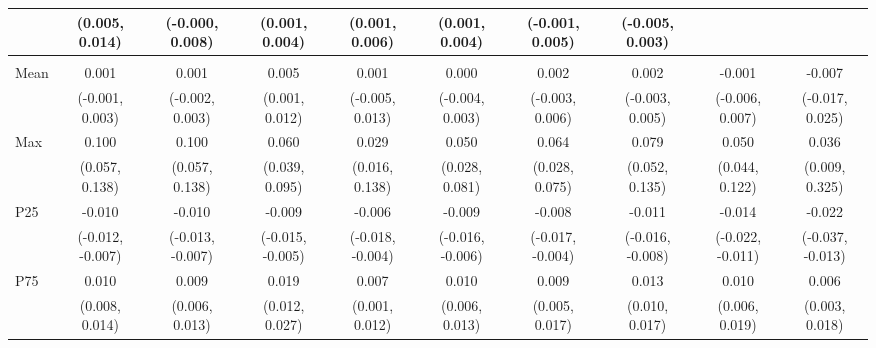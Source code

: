 {\begin{tabular}{l|c|c|c|c|c|c|c|c|c}
& {\scriptsize (0.005, 0.014)}
& {\scriptsize (-0.000, 0.008)}
& {\scriptsize (0.001, 0.004)}
& {\scriptsize (0.001, 0.006)}
& {\scriptsize (0.001, 0.004)}
& {\scriptsize (-0.001, 0.005)}
& {\scriptsize (-0.005, 0.003)}
\\ [0.1cm]
\hline
\noalign{\smallskip}
\multicolumn{10}{l}{\textbf{Effect with Leads and Lags}} \\
\noalign{\smallskip}
\hline
Mean
& 0.001 & 0.001 & 0.005 & 0.001 & 0.000 & 0.002 & 0.002 & -0.001 & -0.007 \\
& {\scriptsize (-0.001, 0.003)}
& {\scriptsize (-0.002, 0.003)}
& {\scriptsize (0.001, 0.012)}
& {\scriptsize (-0.005, 0.013)}
& {\scriptsize (-0.004, 0.003)}
& {\scriptsize (-0.003, 0.006)}
& {\scriptsize (-0.003, 0.005)}
& {\scriptsize (-0.006, 0.007)}
& {\scriptsize (-0.017, 0.025)}
\\ [0.1cm]
\hline
Max
& 0.100 & 0.100 & 0.060 & 0.029 & 0.050 & 0.064 & 0.079 & 0.050 & 0.036 \\
& {\scriptsize (0.057, 0.138)}
& {\scriptsize (0.057, 0.138)}
& {\scriptsize (0.039, 0.095)}
& {\scriptsize (0.016, 0.138)}
& {\scriptsize (0.028, 0.081)}
& {\scriptsize (0.028, 0.075)}
& {\scriptsize (0.052, 0.135)}
& {\scriptsize (0.044, 0.122)}
& {\scriptsize (0.009, 0.325)}
\\ [0.1cm]
\hline
P25
& -0.010 & -0.010 & -0.009 & -0.006 & -0.009 & -0.008 & -0.011 & -0.014 & -0.022 \\
& {\scriptsize (-0.012, -0.007)}
& {\scriptsize (-0.013, -0.007)}
& {\scriptsize (-0.015, -0.005)}
& {\scriptsize (-0.018, -0.004)}
& {\scriptsize (-0.016, -0.006)}
& {\scriptsize (-0.017, -0.004)}
& {\scriptsize (-0.016, -0.008)}
& {\scriptsize (-0.022, -0.011)}
& {\scriptsize (-0.037, -0.013)}
\\ [0.1cm]
\hline
P75
& 0.010 & 0.009 & 0.019 & 0.007 & 0.010 & 0.009 & 0.013 & 0.010 & 0.006 \\
& {\scriptsize (0.008, 0.014)}
& {\scriptsize (0.006, 0.013)}
& {\scriptsize (0.012, 0.027)}
& {\scriptsize (0.001, 0.012)}
& {\scriptsize (0.006, 0.013)}
& {\scriptsize (0.005, 0.017)}
& {\scriptsize (0.010, 0.017)}
& {\scriptsize (0.006, 0.019)}
& {\scriptsize (0.003, 0.018)}
\\ [0.1cm]
\hline
\hline
\end{tabular}
}
